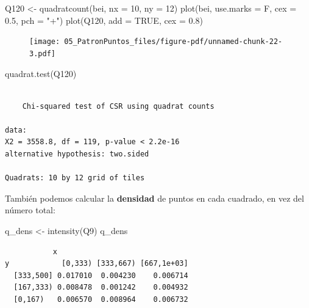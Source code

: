 \documentclass[
  letterpaper,
  DIV=11,
  numbers=noendperiod]{scrreprt}
\newenvironment{Shaded}{\begin{snugshade}}{\end{snugshade}}
\newcommand{\AttributeTok}[1]{\textcolor[rgb]{0.40,0.45,0.13}{#1}}
\newcommand{\ConstantTok}[1]{\textcolor[rgb]{0.56,0.35,0.01}{#1}}
\newcommand{\DecValTok}[1]{\textcolor[rgb]{0.68,0.00,0.00}{#1}}
\newcommand{\FloatTok}[1]{\textcolor[rgb]{0.68,0.00,0.00}{#1}}
\newcommand{\FunctionTok}[1]{\textcolor[rgb]{0.28,0.35,0.67}{#1}}
\newcommand{\NormalTok}[1]{\textcolor[rgb]{0.00,0.23,0.31}{#1}}
\newcommand{\OtherTok}[1]{\textcolor[rgb]{0.00,0.23,0.31}{#1}}
\newcommand{\StringTok}[1]{\textcolor[rgb]{0.13,0.47,0.30}{#1}}
\begin{document}
\begin{Shaded}
\begin{Highlighting}[]
\NormalTok{Q120 }\OtherTok{\textless{}{-}} \FunctionTok{quadratcount}\NormalTok{(bei, }\AttributeTok{nx =} \DecValTok{10}\NormalTok{, }\AttributeTok{ny =} \DecValTok{12}\NormalTok{)}
\FunctionTok{plot}\NormalTok{(bei, }\AttributeTok{use.marks =}\NormalTok{ F, }\AttributeTok{cex =} \FloatTok{0.5}\NormalTok{, }\AttributeTok{pch =} \StringTok{"+"}\NormalTok{)}
\FunctionTok{plot}\NormalTok{(Q120, }\AttributeTok{add =} \ConstantTok{TRUE}\NormalTok{, }\AttributeTok{cex =} \FloatTok{0.8}\NormalTok{)}
\end{Highlighting}
\end{Shaded}

\begin{figure}[H]

{\centering \texttt{[image: 05\_PatronPuntos\_files/figure-pdf/unnamed-chunk-22-3.pdf]}

}

\end{figure}

\begin{Shaded}
\begin{Highlighting}[]
\FunctionTok{quadrat.test}\NormalTok{(Q120)}
\end{Highlighting}
\end{Shaded}

\begin{verbatim}

    Chi-squared test of CSR using quadrat counts

data:  
X2 = 3558.8, df = 119, p-value < 2.2e-16
alternative hypothesis: two.sided

Quadrats: 10 by 12 grid of tiles
\end{verbatim}

También podemos calcular la \textbf{densidad} de puntos en cada
cuadrado, en vez del número total:

\begin{Shaded}
\begin{Highlighting}[]
\NormalTok{q\_dens }\OtherTok{\textless{}{-}} \FunctionTok{intensity}\NormalTok{(Q9)}
\NormalTok{q\_dens}
\end{Highlighting}
\end{Shaded}

\begin{verbatim}
           x
y            [0,333) [333,667) [667,1e+03]
  [333,500] 0.017010  0.004230    0.006714
  [167,333) 0.008478  0.001242    0.004932
  [0,167)   0.006570  0.008964    0.006732
\end{verbatim}
\end{document}
